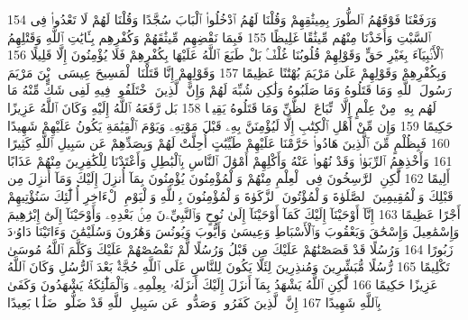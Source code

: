 {\tiny\colorbox{cl_aya}{154}} وَرَفَعْنَا فَوْقَهُمُ ٱلطُّورَ بِمِيثَٰقِهِمْ وَقُلْنَا لَهُمُ ٱدْخُلُوا۟ ٱلْبَابَ سُجَّدًا وَقُلْنَا لَهُمْ لَا تَعْدُوا۟ فِى ٱلسَّبْتِ وَأَخَذْنَا مِنْهُم مِّيثَٰقًا غَلِيظًا
{\tiny\colorbox{cl_aya}{155}} فَبِمَا نَقْضِهِم مِّيثَٰقَهُمْ وَكُفْرِهِم بِـَٔايَٰتِ ٱللَّهِ وَقَتْلِهِمُ ٱلْأَنۢبِيَآءَ بِغَيْرِ حَقٍّ وَقَوْلِهِمْ قُلُوبُنَا غُلْفٌۢ بَلْ طَبَعَ ٱللَّهُ عَلَيْهَا بِكُفْرِهِمْ فَلَا يُؤْمِنُونَ إِلَّا قَلِيلًا
{\tiny\colorbox{cl_aya}{156}} وَبِكُفْرِهِمْ وَقَوْلِهِمْ عَلَىٰ مَرْيَمَ بُهْتَٰنًا عَظِيمًا
{\tiny\colorbox{cl_aya}{157}} وَقَوْلِهِمْ إِنَّا قَتَلْنَا ٱلْمَسِيحَ عِيسَى ٱبْنَ مَرْيَمَ رَسُولَ ٱللَّهِ وَمَا قَتَلُوهُ وَمَا صَلَبُوهُ وَلَٰكِن شُبِّهَ لَهُمْ وَإِنَّ ٱلَّذِينَ ٱخْتَلَفُوا۟ فِيهِ لَفِى شَكٍّ مِّنْهُ مَا لَهُم بِهِۦ مِنْ عِلْمٍ إِلَّا ٱتِّبَاعَ ٱلظَّنِّ وَمَا قَتَلُوهُ يَقِينًۢا
{\tiny\colorbox{cl_aya}{158}} بَل رَّفَعَهُ ٱللَّهُ إِلَيْهِ وَكَانَ ٱللَّهُ عَزِيزًا حَكِيمًا
{\tiny\colorbox{cl_aya}{159}} وَإِن مِّنْ أَهْلِ ٱلْكِتَٰبِ إِلَّا لَيُؤْمِنَنَّ بِهِۦ قَبْلَ مَوْتِهِۦ وَيَوْمَ ٱلْقِيَٰمَةِ يَكُونُ عَلَيْهِمْ شَهِيدًا
{\tiny\colorbox{cl_aya}{160}} فَبِظُلْمٍ مِّنَ ٱلَّذِينَ هَادُوا۟ حَرَّمْنَا عَلَيْهِمْ طَيِّبَٰتٍ أُحِلَّتْ لَهُمْ وَبِصَدِّهِمْ عَن سَبِيلِ ٱللَّهِ كَثِيرًا
{\tiny\colorbox{cl_aya}{161}} وَأَخْذِهِمُ ٱلرِّبَوٰا۟ وَقَدْ نُهُوا۟ عَنْهُ وَأَكْلِهِمْ أَمْوَٰلَ ٱلنَّاسِ بِٱلْبَٰطِلِ وَأَعْتَدْنَا لِلْكَٰفِرِينَ مِنْهُمْ عَذَابًا أَلِيمًا
{\tiny\colorbox{cl_aya}{162}} لَّٰكِنِ ٱلرَّٰسِخُونَ فِى ٱلْعِلْمِ مِنْهُمْ وَٱلْمُؤْمِنُونَ يُؤْمِنُونَ بِمَآ أُنزِلَ إِلَيْكَ وَمَآ أُنزِلَ مِن قَبْلِكَ وَٱلْمُقِيمِينَ ٱلصَّلَوٰةَ وَٱلْمُؤْتُونَ ٱلزَّكَوٰةَ وَٱلْمُؤْمِنُونَ بِٱللَّهِ وَٱلْيَوْمِ ٱلْءَاخِرِ أُو۟لَٰٓئِكَ سَنُؤْتِيهِمْ أَجْرًا عَظِيمًا
{\tiny\colorbox{cl_aya}{163}} إِنَّآ أَوْحَيْنَآ إِلَيْكَ كَمَآ أَوْحَيْنَآ إِلَىٰ نُوحٍ وَٱلنَّبِيِّۦنَ مِنۢ بَعْدِهِۦ وَأَوْحَيْنَآ إِلَىٰٓ إِبْرَٰهِيمَ وَإِسْمَٰعِيلَ وَإِسْحَٰقَ وَيَعْقُوبَ وَٱلْأَسْبَاطِ وَعِيسَىٰ وَأَيُّوبَ وَيُونُسَ وَهَٰرُونَ وَسُلَيْمَٰنَ وَءَاتَيْنَا دَاوُۥدَ زَبُورًا
{\tiny\colorbox{cl_aya}{164}} وَرُسُلًا قَدْ قَصَصْنَٰهُمْ عَلَيْكَ مِن قَبْلُ وَرُسُلًا لَّمْ نَقْصُصْهُمْ عَلَيْكَ وَكَلَّمَ ٱللَّهُ مُوسَىٰ تَكْلِيمًا
{\tiny\colorbox{cl_aya}{165}} رُّسُلًا مُّبَشِّرِينَ وَمُنذِرِينَ لِئَلَّا يَكُونَ لِلنَّاسِ عَلَى ٱللَّهِ حُجَّةٌۢ بَعْدَ ٱلرُّسُلِ وَكَانَ ٱللَّهُ عَزِيزًا حَكِيمًا
{\tiny\colorbox{cl_aya}{166}} لَّٰكِنِ ٱللَّهُ يَشْهَدُ بِمَآ أَنزَلَ إِلَيْكَ أَنزَلَهُۥ بِعِلْمِهِۦ وَٱلْمَلَٰٓئِكَةُ يَشْهَدُونَ وَكَفَىٰ بِٱللَّهِ شَهِيدًا
{\tiny\colorbox{cl_aya}{167}} إِنَّ ٱلَّذِينَ كَفَرُوا۟ وَصَدُّوا۟ عَن سَبِيلِ ٱللَّهِ قَدْ ضَلُّوا۟ ضَلَٰلًۢا بَعِيدًا
